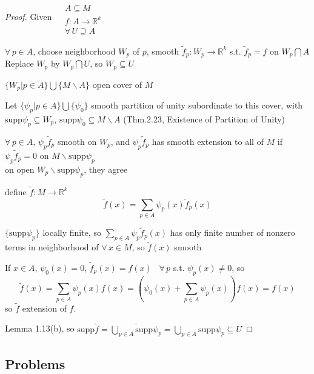 \documentclass[11pt]{amsart}
\theoremstyle{definition}
\begin{document}
\begin{proof}
Given $\begin{aligned} & \quad \\
  & A \subseteq M \\
  & f: A \to \mathbb{R}^k \\
  & \forall \, U \supseteq A \end{aligned}$

$\forall \, p \in A$, choose neighborhood $W_p$ of $p$, smooth $\widetilde{f}_p:W_p \to \mathbb{R}^k$ s.t. $\widetilde{f}_p = f$ on $W_p \bigcap A$ \\

Replace $W_p $ by $W_p \bigcap U$, so $W_p \subseteq U$

$\lbrace W_p | p \in A \rbrace \bigcup \lbrace M \backslash A\rbrace$ open cover of $M$

Let $\lbrace \psi_p | p \in A\rbrace \bigcup \lbrace \psi_0 \rbrace$ smooth partition of unity subordinate to this cover, with $\text{supp}{\psi_p} \subseteq W_p$, $\text{supp}{\psi_0} \subseteq M\backslash A$ (Thm.2.23, Existence of Partition of Unity)

$\forall \, p \in A$, $\psi_p \widetilde{f}_p$ smooth on $W_p$, and $\psi_p \widetilde{f}_p$ has smooth extension to all of $M$ if $\psi_p \widetilde{f}_p = 0 $ on $M \backslash \text{supp}{\psi_p}$  \\
\quad on open $W_p \backslash \text{supp}{\psi_p}$, they agree

define $\widetilde{f} : M \to \mathbb{R}^k$
\[
\widetilde{f}(x) = \sum_{ p \in A} \psi_p(x) \widetilde{f}_p(x)
\]

$\lbrace \text{supp}{ \psi_p} \rbrace$ locally finite, so $\sum_{p \in A} \psi_p \widetilde{f}_p(x)$ has only finite number of nonzero terms in neighborhood of $\forall \, x \in M$, so $\widetilde{f}(x)$ smooth

If $x\in A$, $\psi_0(x) =0$, $\widetilde{f}_p(x)  = f(x)$ \quad \, $\forall \, p $ s.t. $\psi_p(x) \neq 0$, so
\[
\widetilde{f}(x) = \sum_{p \in A} \psi_p(x) f(x) = (\psi_0(x) + \sum_{p\in A} \psi_p(x) )f(x) = f(x)
\]
so $\widetilde{f}$ extension of $f$.

Lemma 1.13(b), so $\text{supp}{\widetilde{f}} = \overline{ \bigcup_{p\in A} \text{supp}{\psi_p} } = \bigcup_{p\in A} \text{supp}{\psi_p} \subseteq U$



\end{proof}


\subsection*{ Problems}
\end{document}
